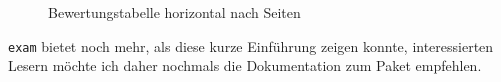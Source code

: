 \begin{figure}
\caption{Bewertungstabelle horizontal nach Seiten}\label{fig:ver}
\end{figure} 


\texttt{exam} bietet noch mehr, als diese kurze Einführung zeigen konnte, interessierten Lesern möchte ich daher nochmals die Dokumentation zum Paket empfehlen. 